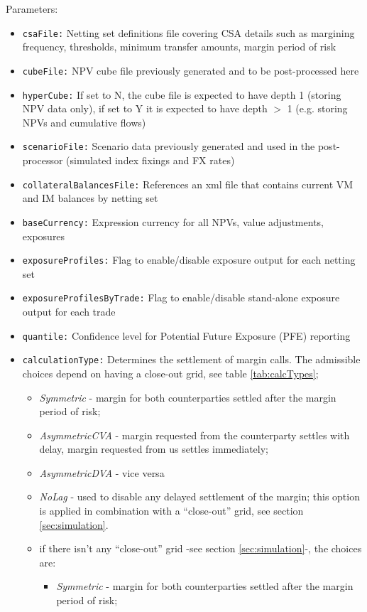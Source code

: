 {Parameters:
\begin{itemize}
\item {\tt csaFile:} Netting set definitions file covering CSA details such as margining frequency, thresholds, minimum
transfer amounts, margin period of risk
\item {\tt cubeFile:} NPV cube file previously generated and to be post-processed here
\item {\tt hyperCube:} If set to N, the cube file is expected to have depth 1 (storing NPV data only), if set to Y it is
expected to have depth $>$ 1 (e.g. storing NPVs and cumulative flows)
\item {\tt scenarioFile:} Scenario data previously generated and used in the post-processor (simulated index fixings and
FX rates)
\item {\tt collateralBalancesFile:} References an xml file that contains current VM and IM balances by netting set
\item {\tt baseCurrency:} Expression currency for all NPVs, value adjustments, exposures
\item {\tt exposureProfiles:} Flag to enable/disable exposure output for each netting set
\item {\tt exposureProfilesByTrade:} Flag to enable/disable stand-alone exposure output for each trade
\item {\tt quantile:} Confidence level for Potential Future Exposure (PFE) reporting
\item {\tt calculationType:} Determines the settlement of margin calls. The admissible choices depend on having a close-out grid, see table \ref{tab:calcTypes}; \\
  \begin{itemize}
  \item {\em Symmetric} - margin for both counterparties settled after the margin period of risk; 
  \item {\em AsymmetricCVA} - margin requested from the counterparty settles with delay,
    margin requested from us settles immediately; 
  \item {\em AsymmetricDVA} - vice versa 
  \item {\em NoLag} - used to disable any delayed settlement of the margin; this option is applied in combination with a ``close-out'' grid, see section \ref{sec:simulation}. 
  \item if there isn't any ``close-out'' grid -see section \ref{sec:simulation}-, the choices are:
    \begin{itemize}
    \item {\em Symmetric} - margin for both counterparties settled after the margin period of risk;

\end{itemize}
\end{itemize}
\end{itemize}}
